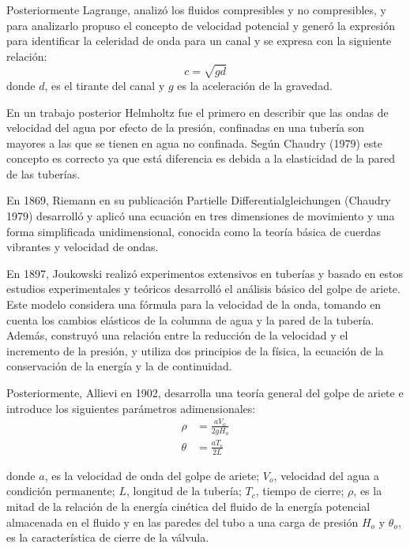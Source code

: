 \documentclass[letterpaper]{report}
\begin{document}
\begin{mdframed}[backgroundcolor=azulpastel]
Posteriormente Lagrange, analizó los fluidos compresibles y no compresibles, y para analizarlo propuso el concepto de velocidad potencial y generó la expresión para 
identificar la celeridad de onda para un canal y se expresa con la siguiente relación:
\begin{equation}
	c = \sqrt{gd}
\end{equation}
donde $d$, es el tirante del canal y $g$ es la aceleración de la gravedad.\bigskip

En un trabajo posterior Helmholtz fue el primero en describir que las ondas de velocidad del agua por efecto de la presión, confinadas en una tubería son mayores a 
las que se tienen en agua no confinada. Según Chaudry (1979) este concepto es correcto ya que está diferencia es debida a la elasticidad de la pared de las tuberías.\bigskip

En 1869, Riemann en su publicación Partielle Differentialgleichungen (Chaudry 1979) desarrolló y aplicó una ecuación en tres dimensiones de movimiento y una forma 
simplificada unidimensional, conocida como la teoría básica de cuerdas vibrantes y velocidad de ondas.\bigskip

En 1897, Joukowski realizó experimentos extensivos en tuberías y basado en estos estudios experimentales y teóricos desarrolló el análisis básico del golpe de ariete. 
Este modelo considera una fórmula para la velocidad de la onda, tomando en cuenta los cambios elásticos de la columna de agua y la pared de la tubería. Además, 
construyó una relación entre la reducción de la velocidad y el incremento de la presión, y utiliza dos principios de la física, la ecuación de la conservación de la 
energía y la de continuidad.\bigskip

Posteriormente, Allievi en 1902, desarrolla una teoría general del golpe de ariete e introduce los siguientes parámetros adimensionales:
\begin{align}
	\rho & = \frac{aV_o}{2gH_o}\\
	\theta & = \frac{aT_c}{2L}
\end{align}

donde $a$, es la velocidad de onda del golpe de ariete; $V_o$, velocidad del agua a condición permanente; $L$, longitud de la tubería; $T_c$, tiempo de cierre; $\rho$, es 
la mitad de la relación de la energía cinética del fluido de la energía potencial almacenada en el fluido y en las paredes del tubo a una carga de presión $H_o$ y 
$\theta_o$, es la característica de cierre de la válvula.
\end{mdframed}
\end{document}
